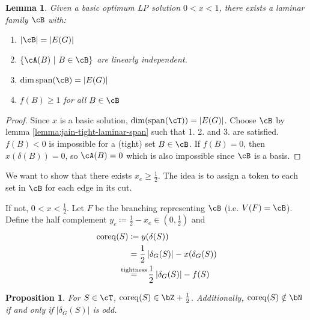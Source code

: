 \documentclass[11pt, a4paper]{article}
\newcommand{\stackalign}[2]{\stackrel{\mathclap{#1}}{#2}}
\newcommand{\abs}[1]{\left\lvert#1\right\rvert}
\newcommand{\set}[1]{\{#1\}}
\newtheorem{lemma}[theorem]{Lemma}
\newtheorem{prop}[theorem]{Proposition}
\theoremstyle{remark}
\theoremstyle{definition}
\begin{document}
\begin{lemma}
	Given a basic optimum LP solution $0<x<1$, there exists a laminar
	family $\cB$ with:
	\begin{enumerate}
		\item $\abs{\cB}=\abs{E(G)}$
		\item $\set{\cA(B)\ |\ B\in\cB}$ are linearly independent.
		\item $\dim\mathrm{span}(\cB)=\abs{E(G)}$
		\item $f(B)\geq1$ for all $B\in\cB$
	\end{enumerate}
\end{lemma}
\begin{proof}
	Since $x$ is a basic solution, $\dim(\mathrm{span}(\cT))=\abs{E(G)}$.
	Choose $\cB$ by lemma \ref{lemma:jain-tight-laminar-span} such that
	1. 2. and 3. are satisfied. $f(B)<0$ is impossible for a (tight) set
	$B\in\cB$. If $f(B)=0$, then $x(\delta(B))=0$, so $\cA(B)=0$ which is
	also impossible since $\cB$ is a basis.
\end{proof}

We want to show that there exists $x_e\geq\frac{1}{2}$. The idea is to
assign a token to each set in $\cB$ for each edge in its cut.

If not, $0<x<\frac{1}{2}$.
Let $F$ be the branching representing $\cB$ (i.e. $V(F)=\cB$). Define
the half complement $y_e\coloneqq \frac{1}{2}-x_e\in (0,\frac{1}{2})$
and
\begin{align*}
	\mathrm{coreq}(S)&\coloneqq y(\delta(S)) \\
	&=\frac{1}{2}\abs{\delta_G(S)}-x(\delta_G(S)) \\
	&\stackalign{\text{tightness}}{=}\quad\frac{1}{2}\abs{\delta_G(S)}-f(S)
\end{align*}

\begin{prop}
	For $S\in\cT$, $\mathrm{coreq}(S)\in \bZ+\frac{1}{2}$. Additionally,
	$\mathrm{coreq}(S)\notin\bN$ if and only if $\abs{\delta_G(S)}$ is odd.
\end{prop}
\end{document}
